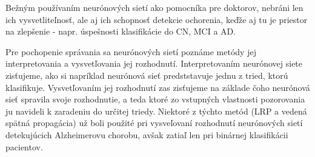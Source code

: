 Bežným používaním neurónových sietí ako pomocníka pre doktorov, nebráni len ich vysvetliteľnosť, ale aj ich schopnosť detekcie ochorenia, keďže aj tu je priestor na zlepšenie - napr. úspešnosti klasifikácie do CN, MCI a AD.

Pre pochopenie správania sa neurónových sietí poznáme metódy jej interpretovania a vysvetľovania jej rozhodnutí. Interpretovaním neurónovej siete zisťujeme, ako si napríklad neurónová sieť predststavuje jednu z tried, ktorú klasifikuje. Vysvetľovaním jej rozhodnutí zas zisťujeme na základe čoho neurónová sieť spravila svoje rozhodnutie, a teda ktoré zo vstupných vlastnosti pozorovania ju navideli k zaradeniu do určitej triedy. Niektoré z týchto metód (LRP a vedená spätná propagácia) už boli použité pri vysveľovaní rozhodnutí neurónových sietí detekujúcich Alzheimerovu chorobu, avšak zatiaľ len pri binárnej klasifikácii pacientov.

